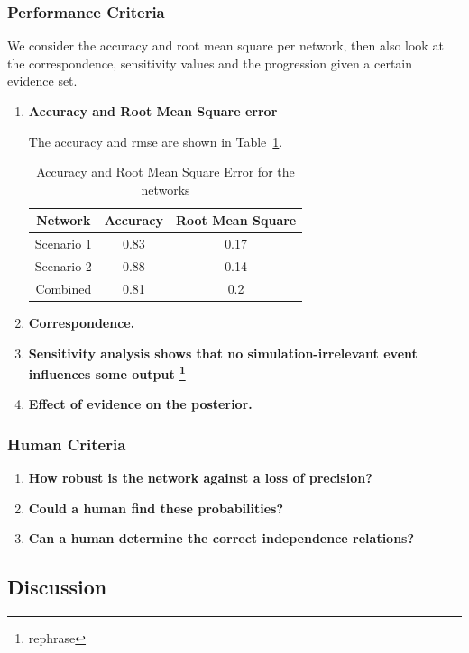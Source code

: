 \subsubsection{Performance Criteria}
We consider the accuracy and root mean square per network, then also look at the correspondence, sensitivity values and the progression given a certain evidence set.
\begin{enumerate}
\item \textbf{Accuracy and Root Mean Square error}

The accuracy and rmse are shown in Table~\ref{tabA}.

\begin{table}[h]
\begin{center}
\begin{tabular}{|c|c|c|}
 \hline
 Network & Accuracy & Root Mean Square\\
 \hline
 Scenario 1   & 0.83 &  0.17   \\
 Scenario 2 & 0.88 & 0.14 \\
 Combined & 0.81 & 0.2 \\
\hline
\end{tabular}
\caption{Accuracy and Root Mean Square Error for the networks}
\end{center}
\label{tabA}
\end{table}

\item \textbf{Correspondence.}
\item \textbf{Sensitivity analysis shows that no simulation-irrelevant event influences some output \footnote{rephrase}}
\item \textbf{Effect of evidence on the posterior.}

\end{enumerate}

\subsubsection{Human Criteria}
\begin{enumerate}
\item \textbf{How robust is the network against a loss of precision?}
\item \textbf{Could a human find these probabilities?}
\item \textbf{ Can a human determine the correct independence relations?}
\end{enumerate}


\subsection{Discussion}

